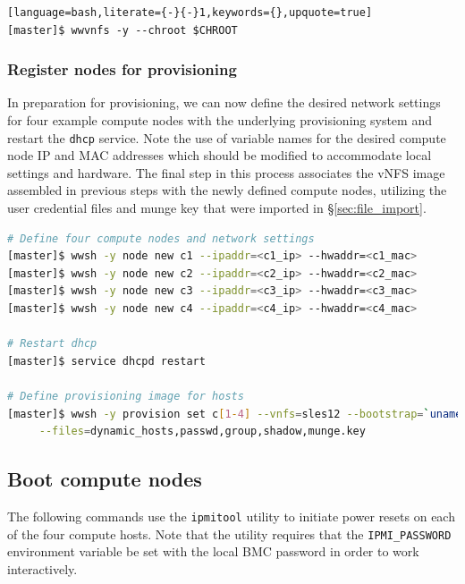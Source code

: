 \documentclass[letterpaper]{article}
\begin{document}
\begin{lstlisting}[language=bash,literate={-}{-}1,keywords={},upquote=true]
[master]$ wwvnfs -y --chroot $CHROOT
\end{lstlisting}

\subsubsection{Register nodes for provisioning}

In preparation for provisioning, we can now define the desired network settings
for four example compute nodes with the underlying provisioning system and
restart the \texttt{dhcp} service. Note the use of variable names for the
desired compute node IP and MAC addresses which should be modified to
accommodate local settings and hardware. The final step in this process
associates the vNFS image assembled in previous steps with the newly defined
compute nodes, utilizing the user credential files and munge key that were
imported in \S\ref{sec:file_import}.


\begin{lstlisting}[language=bash,keywords={},upquote=true,basicstyle=\footnotesize\ttfamily]
# Define four compute nodes and network settings 
[master]$ wwsh -y node new c1 --ipaddr=<c1_ip> --hwaddr=<c1_mac> 
[master]$ wwsh -y node new c2 --ipaddr=<c2_ip> --hwaddr=<c2_mac> 
[master]$ wwsh -y node new c3 --ipaddr=<c3_ip> --hwaddr=<c3_mac> 
[master]$ wwsh -y node new c4 --ipaddr=<c4_ip> --hwaddr=<c4_mac> 

# Restart dhcp 
[master]$ service dhcpd restart

# Define provisioning image for hosts
[master]$ wwsh -y provision set c[1-4] --vnfs=sles12 --bootstrap=`uname -r` \
     --files=dynamic_hosts,passwd,group,shadow,munge.key 
\end{lstlisting}





\subsection{Boot compute nodes}

 
The following commands use the \texttt{ipmitool} utility to initiate power
resets on each of the four compute hosts. Note that the utility requires that
the \texttt{IPMI\_PASSWORD} environment variable be set with the local BMC password in
order to work interactively.
\end{document}
